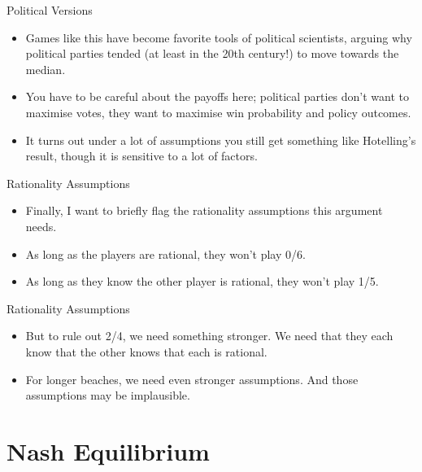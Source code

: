 \documentclass[
  14pt,
  letterpaper,
  ignorenonframetext,
  aspectratio=169,
]{beamer}
\providecommand{\tightlist}{%
  \setlength{\itemsep}{0pt}\setlength{\parskip}{0pt}}\usepackage{longtable,booktabs,array}
\let\olditem\item
\renewcommand{\item}{%
\olditem\vspace{6pt}}
\begin{document}
\begin{frame}{Political Versions}
\protect\hypertarget{political-versions}{}
\begin{itemize}[<+->]
\tightlist
\item
  Games like this have become favorite tools of political scientists,
  arguing why political parties tended (at least in the 20th century!)
  to move towards the median.
\item
  You have to be careful about the payoffs here; political parties don't
  want to maximise votes, they want to maximise win probability and
  policy outcomes.
\item
  It turns out under a lot of assumptions you still get something like
  Hotelling's result, though it is sensitive to a lot of factors.
\end{itemize}
\end{frame}

\begin{frame}{Rationality Assumptions}
\protect\hypertarget{rationality-assumptions}{}
\begin{itemize}[<+->]
\tightlist
\item
  Finally, I want to briefly flag the rationality assumptions this
  argument needs.
\item
  As long as the players are rational, they won't play 0/6.
\item
  As long as they know the other player is rational, they won't play
  1/5.
\end{itemize}
\end{frame}

\begin{frame}{Rationality Assumptions}
\protect\hypertarget{rationality-assumptions-1}{}
\begin{itemize}[<+->]
\tightlist
\item
  But to rule out 2/4, we need something stronger. We need that they
  each know that the other knows that each is rational.
\item
  For longer beaches, we need even stronger assumptions. And those
  assumptions may be implausible.
\end{itemize}
\end{frame}

\hypertarget{nash-equilibrium}{%
\section{Nash Equilibrium}\label{nash-equilibrium}}
\end{document}

